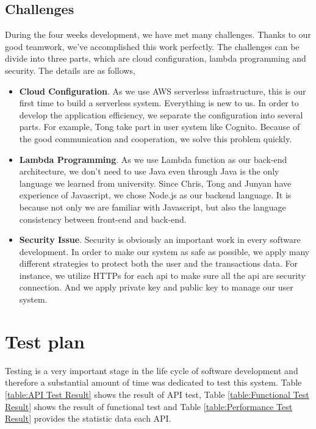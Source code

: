 \documentclass[runningheads]{llncs}
\begin{document}
\subsection{Challenges}
During the four weeks development, we have met many challenges. Thanks to our good teamwork, we've accomplished this work perfectly. The challenges can be divide into three parts, which are cloud configuration, lambda programming and security. The details are as follows,
\begin{itemize}
	\item \textbf{Cloud Configuration}. As we use AWS serverless infrastructure, this is our first time to build a serverless system. Everything is new to us. In order to develop the application efficiency, we separate the configuration into several parts. For example, Tong take part in user system like Cognito. Because of the good communication and cooperation, we solve this problem quickly. 
	\item \textbf{Lambda Programming}. As we use Lambda function as our back-end architecture, we don't need to use Java even through Java is the only language we learned from university. Since Chris, Tong and Junyan have experience of Javascript, we chose Node.js as our backend language. It is because not only we are familiar with Javascript, but also the language consistency between front-end and back-end.
	\item \textbf{Security Issue}. Security is obviously an important work in every software development. In order to make our system as safe as possible, we apply many different strategies to protect both the user and the transactions data. For instance, we utilize HTTPs for each api to make sure all the api are security connection. And we apply private key and public key to manage our user system.
\end{itemize}


\section{Test plan}
Testing is a very important stage in the life cycle of software development and therefore a substantial amount of time was dedicated to test this system. Table \ref{table:API Test Result} shows the result of API test, Table \ref{table:Functional Test Result} shows the result of functional test and Table \ref{table:Performance Test Result} provides the statistic data each API.
\end{document}
